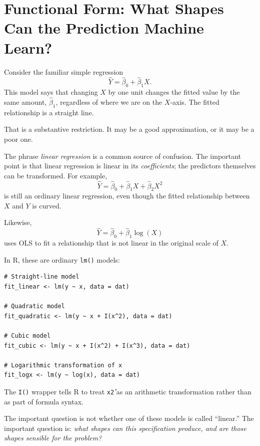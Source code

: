 \documentclass[11pt]{report}
\begin{document}
\begin{center}
\end{center}

\section{Functional Form: What Shapes Can the Prediction Machine Learn?}

Consider the familiar simple regression
\[
\widehat{Y}=\widehat{\beta}_0+\widehat{\beta}_1X.
\]
This model says that changing \(X\) by one unit changes the fitted value by the same amount, \(\widehat{\beta}_1\), regardless of where we are on the \(X\)-axis. The fitted relationship is a straight line.

That is a substantive restriction. It may be a good approximation, or it may be a poor one.

The phrase \emph{linear regression} is a common source of confusion. The important point is that linear regression is linear in its \emph{coefficients}; the predictors themselves can be transformed. For example,
\[
\widehat{Y}
=
\widehat{\beta}_0
+
\widehat{\beta}_1X
+
\widehat{\beta}_2X^2
\]
is still an ordinary linear regression, even though the fitted relationship between \(X\) and \(Y\) is curved.

Likewise,
\[
\widehat{Y}
=
\widehat{\beta}_0
+
\widehat{\beta}_1\log(X)
\]
uses OLS to fit a relationship that is not linear in the original scale of \(X\).

In R, these are ordinary \texttt{lm()} models:

\begin{lstlisting}
# Straight-line model
fit_linear <- lm(y ~ x, data = dat)

# Quadratic model
fit_quadratic <- lm(y ~ x + I(x^2), data = dat)

# Cubic model
fit_cubic <- lm(y ~ x + I(x^2) + I(x^3), data = dat)

# Logarithmic transformation of x
fit_logx <- lm(y ~ log(x), data = dat)
\end{lstlisting}

The \texttt{I()} wrapper tells R to treat \texttt{x\^2} as an arithmetic transformation rather than as part of formula syntax.

The important question is not whether one of these models is called ``linear.'' The important question is: \emph{what shapes can this specification produce, and are those shapes sensible for the problem?}
\end{document}
